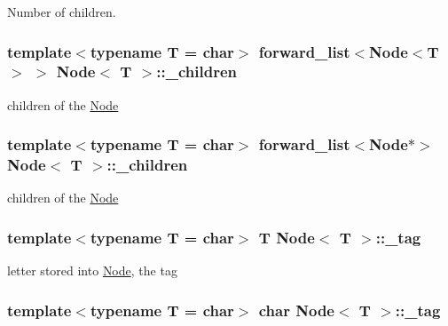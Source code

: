 Number of children. 

\hypertarget{class_node_a845317829093b3d4665ba7e0055b4599}{
\subsubsection[{\-\_\-children}]{\setlength{\rightskip}{0pt plus 5cm}template$<$typename T = char$>$ forward\-\_\-list$<${\bf Node}$<$T$>$ $>$ {\bf Node}$<$ T $>$\-::\-\_\-children\hspace{0.3cm}{\ttfamily [private]}}}\label{class_node_a845317829093b3d4665ba7e0055b4599}


children of the \hyperlink{class_node}{Node} 

\hypertarget{class_node_ac4c86c8bbc999016827248dbe8b7cc96}{
\subsubsection[{\-\_\-children}]{\setlength{\rightskip}{0pt plus 5cm}template$<$typename T = char$>$ forward\-\_\-list$<${\bf Node}$\ast$$>$ {\bf Node}$<$ T $>$\-::\-\_\-children\hspace{0.3cm}{\ttfamily [private]}}}\label{class_node_ac4c86c8bbc999016827248dbe8b7cc96}


children of the \hyperlink{class_node}{Node} 

\hypertarget{class_node_a82089b860871012bc159c510408be29c}{
\subsubsection[{\-\_\-tag}]{\setlength{\rightskip}{0pt plus 5cm}template$<$typename T = char$>$ T {\bf Node}$<$ T $>$\-::\-\_\-tag\hspace{0.3cm}{\ttfamily [private]}}}\label{class_node_a82089b860871012bc159c510408be29c}


letter stored into \hyperlink{class_node}{Node}, the tag 

\hypertarget{class_node_a24a667af4a37caad6e15b94fb76885b1}{
\subsubsection[{\-\_\-tag}]{\setlength{\rightskip}{0pt plus 5cm}template$<$typename T = char$>$ char {\bf Node}$<$ T $>$\-::\-\_\-tag\hspace{0.3cm}{\ttfamily [private]}}}\label{class_node_a24a667af4a37caad6e15b94fb76885b1}


